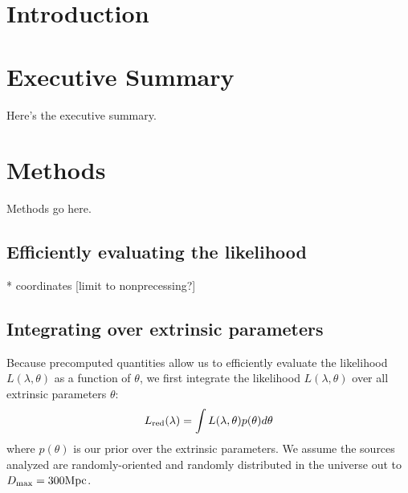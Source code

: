 \documentclass[twocolumn,prd,nofootinbib]{revtex4}
\newcommand\unit[1]{{\rm #1}}
\begin{document}
\section{Introduction}

\section{Executive Summary}

Here's the executive summary.

\section{Methods}

Methods go here.

\subsection{Efficiently evaluating the likelihood}

* coordinates [limit to nonprecessing?]

\subsection{Integrating over extrinsic parameters}

Because precomputed quantities allow us to efficiently evaluate the likelihood $L(\lambda,\theta)$ as a function of
$\theta$, we first integrate the likelihood $L(\lambda,\theta)$ over all extrinsic parameters $\theta$:
\begin{eqnarray}
L_{\rm red}(\lambda) = \int L(\lambda,\theta) p(\theta) d\theta
\end{eqnarray}
where $p(\theta)$ is our prior over the extrinsic  parameters.  We assume the sources analyzed are randomly-oriented and
randomly distributed in the universe out to $D_{\rm max}=300 \unit{Mpc}$.  
\end{document}
